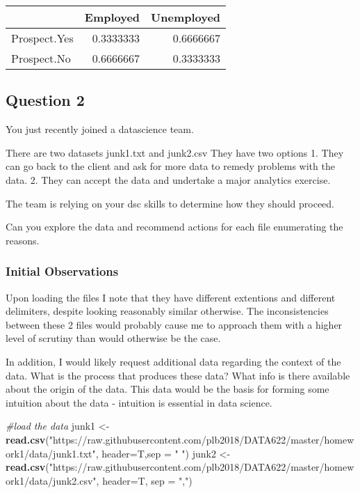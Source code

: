 \documentclass[]{article}
\newenvironment{Shaded}{\begin{snugshade}}{\end{snugshade}}
\newcommand{\KeywordTok}[1]{\textcolor[rgb]{0.13,0.29,0.53}{\textbf{#1}}}
\newcommand{\DataTypeTok}[1]{\textcolor[rgb]{0.13,0.29,0.53}{#1}}
\newcommand{\StringTok}[1]{\textcolor[rgb]{0.31,0.60,0.02}{#1}}
\newcommand{\CommentTok}[1]{\textcolor[rgb]{0.56,0.35,0.01}{\textit{#1}}}
\newcommand{\NormalTok}[1]{#1}
\begin{document}
\begin{longtable}[]{@{}lrr@{}}
\toprule
& Employed & Unemployed\tabularnewline
\midrule
\endhead
Prospect.Yes & 0.3333333 & 0.6666667\tabularnewline
Prospect.No & 0.6666667 & 0.3333333\tabularnewline
\bottomrule
\end{longtable}

\subsection{Question 2}\label{question-2}

You just recently joined a datascience team.

There are two datasets junk1.txt and junk2.csv They have two options 1.
They can go back to the client and ask for more data to remedy problems
with the data. 2. They can accept the data and undertake a major
analytics exercise.

The team is relying on your dsc skills to determine how they should
proceed.

Can you explore the data and recommend actions for each file enumerating
the reasons.

\subsubsection{Initial Observations}\label{initial-observations}

Upon loading the files I note that they have different extentions and
different delimiters, despite looking reasonably similar otherwise. The
inconsistencies between these 2 files would probably cause me to
approach them with a higher level of scrutiny than would otherwise be
the case.

In addition, I would likely request additional data regarding the
context of the data. What is the process that produces these data? What
info is there available about the origin of the data. This data would be
the basis for forming some intuition about the data - intuition is
essential in data science.

\begin{Shaded}
\begin{Highlighting}[]
\CommentTok{#load the data}
\NormalTok{junk1 <-}\StringTok{ }\KeywordTok{read.csv}\NormalTok{(}\StringTok{"https://raw.githubusercontent.com/plb2018/DATA622/master/homework1/data/junk1.txt"}\NormalTok{, }\DataTypeTok{header=}\NormalTok{T,}\DataTypeTok{sep =} \StringTok{" "}\NormalTok{)}
\NormalTok{junk2 <-}\StringTok{ }\KeywordTok{read.csv}\NormalTok{(}\StringTok{"https://raw.githubusercontent.com/plb2018/DATA622/master/homework1/data/junk2.csv"}\NormalTok{, }\DataTypeTok{header=}\NormalTok{T, }\DataTypeTok{sep =} \StringTok{","}\NormalTok{)}
\end{Highlighting}
\end{Shaded}
\end{document}
